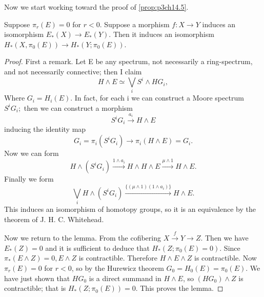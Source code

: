 \documentclass[../main]{subfiles}
\begin{document}
Now we start working toward the proof of \ref{prop:p3ch14.5}.

\begin{lemma} \label{lem:p3ch14.12}
Suppose $ \pi_{r}(E)=0$ for $r<0$. Suppose a morphism $f\colon  X \to  Y $ induces an isomorphism $E_{\ast}(X) \to E_{\ast}(Y)$. Then it induces an isomorphism $H_{\ast}(X, \pi_{0}(E)) \to H_{\ast}(Y;\pi_{0}(E))$. 
\begin{proof} 
    First a remark. Let E be any spectrum, not necessarily a ring-spectrum, and not necessarily connective; then I claim
    $$
      H \wedge E \simeq \bigvee_{i} S^i \wedge HG_i, 
    $$ 
    Where $G_{i} = H_{i}(E)$. In fact, for each i we can construct a Moore spectrum $S^iG_{i};$ then we can construct a morphism
    $$
      S^iG_{i} \xrightarrow{a_{i}} H \wedge E 
    $$ 
    inducing the identity map
    $$
      G_{i} = \pi_{i}(S^iG_{i}) \to \pi_{i}(H \wedge E)= G_{i}.
    $$ 
    Now we can form 
    $$
      H \wedge (S^iG_i) \xrightarrow{1 \wedge a_{i}} H \wedge H \wedge E \xrightarrow{\mu \wedge 1} H \wedge E.  
    $$ 
    Finally we form 
    $$
      \bigvee_{i} H \wedge (S^iG_{i}) \xrightarrow{\{(\mu \wedge 1) (1 \wedge a_{i})\} } H \wedge E.
    $$ 
    This induces an isomorphism of homotopy groups, so it is an equivalence by the theorem of J. H. C. Whitehead.

    Now we return to the lemma. From the cofibering $X\xrightarrow{f} Y \to Z$. Then we have $E_{\ast}(Z)=0$ and it is sufficient to deduce that $H_{\ast}(Z;\pi_{0}(E)=0)$. Since $ \pi_{\ast}(E \wedge Z)=0, E \wedge Z$ is contractible. Therefore $H \wedge E \wedge Z$ is contractible. Now $ \pi_{r}(E)=0$ for $r<0$, so by the Hurewicz theorem $ G_0 = H_0(E) = \pi_{0}(E)$. We have just shown that $HG_0$ is a direct summand in $H \wedge E$, so $(HG_0) \wedge Z$ is contractible; that is $H_{\ast}(Z; \pi_{0}(E))=0$. This proves the lemma.
\end{proof}

\end{lemma}
\end{document}
